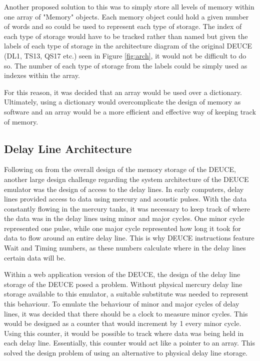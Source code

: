 \documentclass{l4proj}
\begin{document}
Another proposed solution to this was to simply store all levels of memory within one array of "Memory" objects. Each memory object could hold a given number of words and so could be used to represent each type of storage. The index of each type of storage would have to be tracked rather than named but given the labels of each type of storage in the architecture diagram of the original DEUCE (DL1, TS13, QS17 etc.) seen in Figure \ref{fig:arch}, it would not be difficult to do so. The number of each type of storage from the labels could be simply used as indexes within the array.

For this reason, it was decided that an array would be used over a dictionary. Ultimately, using a dictionary would overcomplicate the design of memory as software and an array would be a more efficient and effective way of keeping track of memory.
\subsection{Delay Line Architecture}
Following on from the overall design of the memory storage of the DEUCE, another large design challenge regarding the system architecture of the DEUCE emulator was the design of access to the delay lines. In early computers, delay lines provided access to data using mercury and acoustic pulses. With the data constantly flowing in the mercury tanks, it was necessary to keep track of where the data was in the delay lines using minor and major cycles. One minor cycle represented one pulse, while one major cycle represented how long it took for data to flow around an entire delay line. This is why DEUCE instructions feature Wait and Timing numbers, as these numbers calculate where in the delay lines certain data will be.

Within a web application version of the DEUCE, the design of the delay line storage of the DEUCE posed a problem. Without physical mercury delay line storage available to this emulator, a suitable substitute was needed to represent this behaviour. To emulate the behaviour of minor and major cycles of delay lines, it was decided that there should be a clock to measure minor cycles. This would be designed as a counter that would increment by 1 every minor cycle. Using this counter, it would be possible to track where data was being held in each delay line. Essentially, this counter would act like a pointer to an array. This solved the design problem of using an alternative to physical delay line storage.
\end{document}
